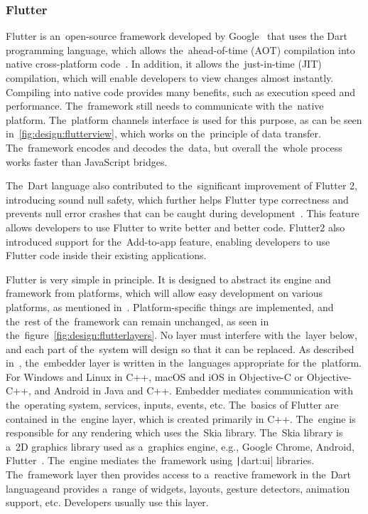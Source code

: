 \subsubsection{Flutter}

Flutter is an~open-source framework developed by Google~\cite{a2022_flutter} that uses the Dart programming language, which allows the~ahead-of-time (AOT) compilation into native cross-platform code~\cite{leler_2017_whats}.
In addition, it allows the~just-in-time (JIT) compilation, which will enable developers to view changes almost instantly.
Compiling into native code provides many benefits, such as execution speed and performance.
The~framework still needs to communicate with the~native platform.
The~platform channels interface is used for this purpose, as can be seen in~\ref{fig:design:flutterview}, which works on the~principle of data transfer.
The~framework encodes and decodes the~data, but overall the~whole process works faster than JavaScript bridges.

The~Dart language also contributed to the~significant improvement of Flutter 2, introducing sound null safety, which further helps Flutter type correctness and prevents null error crashes that can be caught during development~\cite{sells_2021_whats}.
This feature allows developers to use Flutter to write better and better code.
Flutter2 also introduced support for the~Add-to-app feature, enabling developers to use Flutter code inside their existing applications.

Flutter is very simple in principle.
It is designed to abstract its engine and framework from platforms, which will allow easy development on various platforms, as mentioned in~\cite{a2022_flutter_architecture}.
Platform-specific things are implemented, and the~rest of the~framework can remain unchanged, as seen in the~figure~\ref{fig:design:flutterlayers}.
No layer must interfere with the~layer below, and each part of the~system will design so that it can be replaced.
As described in~\cite{a2022_flutter_architecture}, the~embedder layer is written in the~languages appropriate for the~platform.
For Windows and Linux in C++, macOS and iOS in Objective-C or Objective-C++, and Android in Java and C++.
Embedder mediates communication with the~operating system, services, inputs, events, etc.
The~basics of Flutter are contained in the~engine layer, which is created primarily in C++.
The~engine is responsible for any rendering which uses the~Skia library.
The~Skia library is a~2D graphics library used as a~graphics engine, e.g., Google Chrome, Android, Flutter~\cite{skia_2022_skia}.
The~engine mediates the~framework using \texttt|dart:ui| libraries.
The~framework layer then provides access to a~reactive framework in the~Dart language\linebreak{}and provides a~range of widgets, layouts, gesture detectors, animation support, etc.
Developers usually use this layer.


